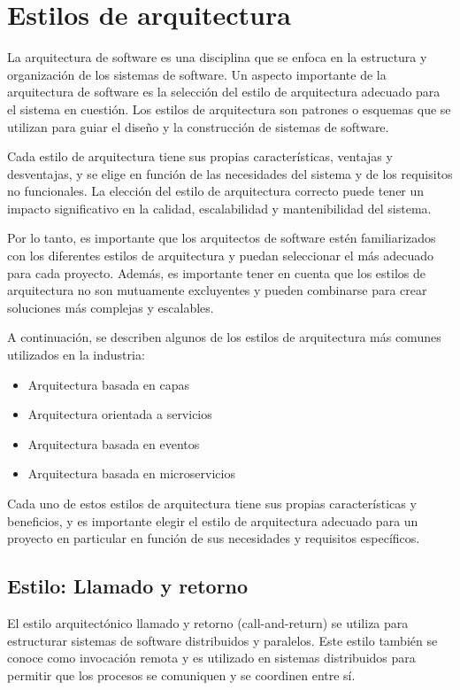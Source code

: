 \documentclass[executivepaper]{article}
\begin{document}
\newpage
\section{Estilos de arquitectura}

La arquitectura de software es una disciplina que se enfoca en la estructura y organización de los sistemas de software. Un aspecto importante de la arquitectura de software es la selección del estilo de arquitectura adecuado para el sistema en cuestión. Los estilos de arquitectura son patrones o esquemas que se utilizan para guiar el diseño y la construcción de sistemas de software.

Cada estilo de arquitectura tiene sus propias características, ventajas y desventajas, y se elige en función de las necesidades del sistema y de los requisitos no funcionales. La elección del estilo de arquitectura correcto puede tener un impacto significativo en la calidad, escalabilidad y mantenibilidad del sistema.

Por lo tanto, es importante que los arquitectos de software estén familiarizados con los diferentes estilos de arquitectura y puedan seleccionar el más adecuado para cada proyecto. Además, es importante tener en cuenta que los estilos de arquitectura no son mutuamente excluyentes y pueden combinarse para crear soluciones más complejas y escalables.

A continuación, se describen algunos de los estilos de arquitectura más comunes utilizados en la industria:

\begin{itemize}
    \item Arquitectura basada en capas
    \item Arquitectura orientada a servicios
    \item Arquitectura basada en eventos
    \item Arquitectura basada en microservicios
\end{itemize}

Cada uno de estos estilos de arquitectura tiene sus propias características y beneficios, y es importante elegir el estilo de arquitectura adecuado para un proyecto en particular en función de sus necesidades y requisitos específicos.

\subsection*{Estilo: Llamado y retorno}
El estilo arquitectónico llamado y retorno (call-and-return) se utiliza para estructurar sistemas de software distribuidos y paralelos. Este estilo también se conoce como invocación remota y es utilizado en sistemas distribuidos para permitir que los procesos se comuniquen y se coordinen entre sí.
\end{document}
